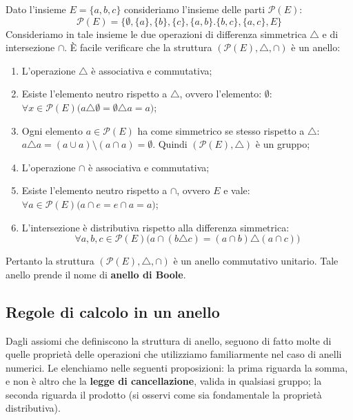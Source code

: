 \begin{example}
	Dato l'insieme $E=\{a,b,c\}$ consideriamo l'insieme delle parti $\mathcal{P}(E)$: $$\mathcal{P}(E)= \{\emptyset, \{a\}, \{b\}, \{c\}, \{a,b\}.\{b,c\},\{a,c\},E\}$$ Consideriamo in tale insieme le due operazioni di differenza simmetrica $\triangle$ e di intersezione $\cap$. È facile verificare che la struttura $(\mathcal{P}(E),\triangle,\cap)$ è un anello:
	\begin{enumerate}
		\item L'operazione $\triangle$ è associativa e commutativa;
		\item Esiste l'elemento neutro rispetto a $\triangle$, ovvero l'elemento: $\emptyset$: $\forall x \in \mathcal{P}(E) \bigl(a \triangle \emptyset = \emptyset \triangle a = a\bigr)$;
		\item Ogni elemento $ a \in \mathcal{P}(E)$ ha come simmetrico se stesso rispetto a $\triangle$: $a \triangle a = (a \cup a ) \setminus (a \cap a) = \emptyset$. Quindi $(\mathcal{P}(E),\triangle)$ è un gruppo;
		\item L'operazione $\cap$ è associativa e commutativa;
		\item Esiste l'elemento neutro rispetto a $\cap$, ovvero $E$ e vale: $\forall a \in \mathcal{P}(E) \bigl(a \cap e = e \cap a = a \bigr)$;
		\item L'intersezione è distributiva rispetto alla differenza simmetrica: $$\forall a,b,c \in \mathcal{P}(E) \bigl(a \cap (b \triangle c) = (a \cap b) \triangle (a \cap c)\bigr)$$
	\end{enumerate}
	Pertanto la struttura $(\mathcal{P}(E),\triangle,\cap)$ è un anello commutativo unitario. Tale anello prende il nome di \textbf{anello di Boole}.
\end{example}



\subsection{Regole di calcolo in un anello}
Dagli assiomi che definiscono la struttura di anello, seguono di fatto molte di quelle proprietà delle operazioni che utilizziamo familiarmente nel caso di anelli numerici. Le elenchiamo nelle seguenti proposizioni: la prima riguarda la somma, e non è altro che la \textbf{legge di cancellazione}, valida in qualsiasi gruppo; la seconda riguarda il prodotto (si osservi come sia fondamentale la proprietà distributiva).


